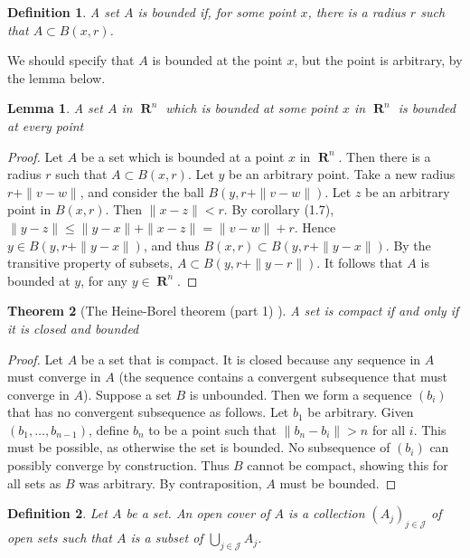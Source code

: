 \documentclass{report}
\newtheorem{theorem}{Theorem}[chapter]
\newtheorem{lemma}[theorem]{Lemma}
\newtheorem{definition}{Definition}
\DeclareMathOperator{\real}{\mathbf{R}}
\begin{document}
\begin{definition}
  A set $A$ is bounded if, for some point $x$, there is a radius $r$ such that $A \subset B(x,r)$.
\end{definition}

We should specify that $A$ is bounded at the point $x$, but the point is arbitrary, by the lemma below.

\begin{lemma}
  A set $A$ in $\real^n$ which is bounded at some point $x$ in $\real^n$ is bounded at every point
\end{lemma}
\begin{proof}
  Let $A$ be a set which is bounded at a point $x$ in $\real^n$. Then there is a radius $r$ such that $A \subset B(x,r)$. Let $y$ be an arbitrary point. Take a new radius $r + \| v - w \|$, and consider the ball $B(y,r + \| v - w \|)$. Let $z$ be an arbitrary point in $B(x,r)$. Then $\| x - z \| < r$. By corollary (1.7), $\| y - z \| \leq \| y - x \| + \| x - z \| = \| v - w \| + r$. Hence $y \in B(y,r + \|y - x\|)$, and thus $B(x,r) \subset B(y,r + \|y - x\|)$. By the transitive property of subsets, $A \subset B(y,r + \|y - r\|)$. It follows that $A$ is bounded at $y$, for any $y \in \real^n$.
\end{proof}

\begin{theorem}[The Heine-Borel theorem (part 1) ]
  A set is compact if and only if it is closed and bounded
\end{theorem}
\begin{proof}
  Let $A$ be a set that is compact. It is closed because any sequence in $A$ must converge in $A$ (the sequence contains a convergent subsequence that must converge in $A$). Suppose a set $B$ is unbounded. Then we form a sequence $(b_i)$ that has no convergent subsequence as follows. Let $b_1$ be arbitrary. Given $(b_1, \dots, b_{n-1})$, define $b_n$ to be a point such that $\| b_n - b_i \| > n$ for all $i$. This must be possible, as otherwise the set is bounded. No subsequence of $(b_i)$ can possibly converge by construction. Thus $B$ cannot be compact, showing this for all sets as $B$ was arbitrary. By contraposition, $A$ must be bounded.
\end{proof}

\begin{definition}
  Let $A$ be a set. An open cover of $A$ is a collection $(A_j)_{j \in \mathcal{J}}$ of open sets such that $A$ is a subset of $\bigcup_{j \in \mathcal{J}} A_j$.
\end{definition}
\end{document}
